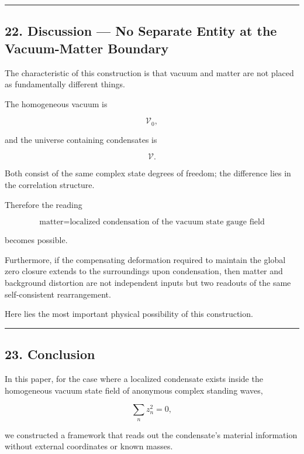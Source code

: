 \documentclass[
  a4paper,
]{article}
\begin{document}
\begin{center}\rule{0.5\linewidth}{0.5pt}\end{center}

\subsection{22. Discussion --- No Separate Entity at the Vacuum-Matter
Boundary}\label{discussion-no-separate-entity-at-the-vacuum-matter-boundary}

The characteristic of this construction is that vacuum and matter are
not placed as fundamentally different things.

The homogeneous vacuum is

\[
\mathcal V_0,
\]

and the universe containing condensates is

\[
\mathcal V.
\]

Both consist of the same complex state degrees of freedom; the
difference lies in the correlation structure.

Therefore the reading

\[
\boxed{
\text{matter}
=
\text{localized condensation of the vacuum state gauge field}
}
\tag{47}
\]

becomes possible.

Furthermore, if the compensating deformation required to maintain the
global zero closure extends to the surroundings upon condensation, then
matter and background distortion are not independent inputs but two
readouts of the same self-consistent rearrangement.

Here lies the most important physical possibility of this construction.

\begin{center}\rule{0.5\linewidth}{0.5pt}\end{center}

\subsection{23. Conclusion}\label{conclusion}

In this paper, for the case where a localized condensate exists inside
the homogeneous vacuum state field of anonymous complex standing waves,

\[
\sum_n z_n^2=0,
\]

we constructed a framework that reads out the condensate's material
information without external coordinates or known masses.
\end{document}

